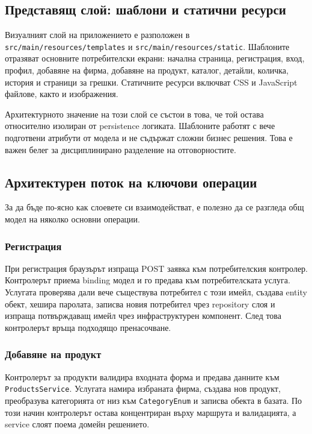\subsection{Представящ слой: шаблони и статични ресурси}

Визуалният слой на приложението е разположен в \texttt{src/main/resources/templates} и \texttt{src/main/resources/static}. Шаблоните отразяват основните потребителски екрани: начална страница, регистрация, вход, профил, добавяне на фирма, добавяне на продукт, каталог, детайли, количка, история и страници за грешки. Статичните ресурси включват CSS и JavaScript файлове, както и изображения.

Архитектурното значение на този слой се състои в това, че той остава относително изолиран от persistence логиката. Шаблоните работят с вече подготвени атрибути от модела и не съдържат сложни бизнес решения. Това е важен белег за дисциплинирано разделение на отговорностите.

\subsection{Архитектурен поток на ключови операции}

За да бъде по-ясно как слоевете си взаимодействат, е полезно да се разгледа общ модел на няколко основни операции.

\subsubsection{Регистрация}

При регистрация браузърът изпраща POST заявка към потребителския контролер. Контролерът приема binding модел и го предава към потребителската услуга. Услугата проверява дали вече съществува потребител с този имейл, създава entity обект, хешира паролата, записва новия потребител чрез repository слоя и изпраща потвърждаващ имейл чрез инфраструктурен компонент. След това контролерът връща подходящо пренасочване.

\subsubsection{Добавяне на продукт}

Контролерът за продукти валидира входната форма и предава данните към \texttt{ProductsService}. Услугата намира избраната фирма, създава нов продукт, преобразува категорията от низ към \texttt{CategoryEnum} и записва обекта в базата. По този начин контролерът остава концентриран върху маршрута и валидацията, а service слоят поема домейн решението.

